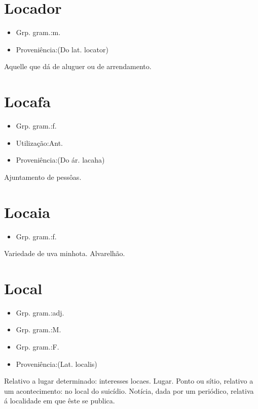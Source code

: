 \section{Locador}
\begin{itemize}
\item {Grp. gram.:m.}
\end{itemize}
\begin{itemize}
\item {Proveniência:(Do lat. \textunderscore locator\textunderscore )}
\end{itemize}
Aquelle que dá de aluguer ou de arrendamento.
\section{Locafa}
\begin{itemize}
\item {Grp. gram.:f.}
\end{itemize}
\begin{itemize}
\item {Utilização:Ant.}
\end{itemize}
\begin{itemize}
\item {Proveniência:(Do ár. \textunderscore lacaha\textunderscore )}
\end{itemize}
Ajuntamento de pessôas.
\section{Locaia}
\begin{itemize}
\item {Grp. gram.:f.}
\end{itemize}
Variedade de uva minhota.
Alvarelhão.
\section{Local}
\begin{itemize}
\item {Grp. gram.:adj.}
\end{itemize}
\begin{itemize}
\item {Grp. gram.:M.}
\end{itemize}
\begin{itemize}
\item {Grp. gram.:F.}
\end{itemize}
\begin{itemize}
\item {Proveniência:(Lat. \textunderscore localis\textunderscore )}
\end{itemize}
Relativo a lugar determinado: \textunderscore interesses locaes\textunderscore .
Lugar.
Ponto ou sítio, relativo a um acontecimento: \textunderscore no local do suicídio\textunderscore .
Notícia, dada por um periódico, relativa á localidade em que êste se publica.
